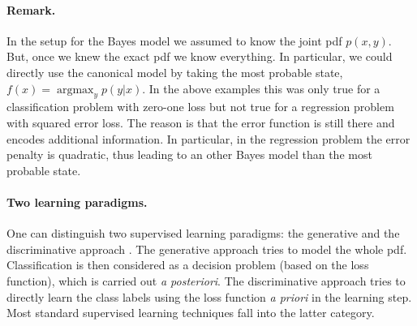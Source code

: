 \documentclass[12pt,a4paper]{article}
\begin{document}
\paragraph{Remark.} In the setup for the Bayes model we assumed to know the joint pdf $p(x,y)$. But, once we knew the exact pdf we know everything. In particular, we could directly use the canonical model by taking the most probable state, $f(x) =  \operatorname{argmax}_y  p(y|x)$. In the above examples this was only true for a classification problem with zero-one loss but not true for a regression problem with squared error loss. The reason is that the error function is still there and encodes additional information. In particular, in the regression problem the error penalty is quadratic, thus  leading to an other Bayes model than the most probable state.

\paragraph{Two learning paradigms.}
One can distinguish two supervised learning paradigms: the generative and the discriminative approach \cite[Chapter~13]{barber}. The generative approach  tries to model the whole pdf. Classification is then considered as a decision problem (based on the loss function), which is carried out\textit{ a posteriori}. The discriminative approach tries to directly learn the class labels using the loss function \textit{a priori} in the learning step. Most standard supervised learning techniques fall into the latter category.
\end{document}
